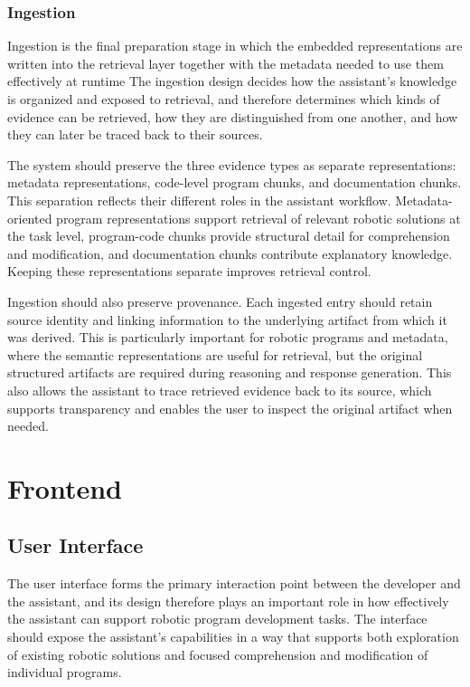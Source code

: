 \subsubsection{Ingestion}
Ingestion is the final preparation stage in which the embedded representations are written into the retrieval layer together with the metadata needed to use them effectively at runtime The ingestion design decides how the assistant's knowledge is organized and exposed to retrieval, and therefore determines which kinds of evidence can be retrieved, how they are distinguished from one another, and how they can later be traced back to their sources.

The system should preserve the three evidence types as separate representations: metadata representations, code-level program chunks, and documentation chunks. This separation reflects their different roles in the assistant workflow. Metadata-oriented program representations support retrieval of relevant robotic solutions at the task level, program-code chunks provide structural detail for comprehension and modification, and documentation chunks contribute explanatory knowledge. Keeping these representations separate improves retrieval control.

Ingestion should also preserve provenance. Each ingested entry should retain source identity and linking information to the underlying artifact from which it was derived. This is particularly important for robotic programs and metadata, where the semantic representations are useful for retrieval, but the original structured artifacts are required during reasoning and response generation. This also allows the assistant to trace retrieved evidence back to its source, which supports transparency and enables the user to inspect the original artifact when needed.


\section{Frontend}
\subsection{User Interface}
The user interface forms the primary interaction point between the developer and the assistant, and its design therefore plays an important role in how effectively the assistant can support robotic program development tasks. The interface should expose the assistant's capabilities in a way that supports both exploration of existing robotic solutions and focused comprehension and modification of individual programs.

